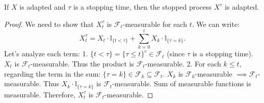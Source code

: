 \begin{proposition}
If $X$ is adapted and $\tau$ is a stopping time, then the stopped process $X^\tau$ is adapted.
\end{proposition}
\begin{proof}
We need to show that $X^\tau_t$ is $\mathcal{F}_t$-measurable for each $t$.
We can write:
\[
X^\tau_t = X_t \cdot \mathbb{I}_{\{t < \tau\}} + \sum_{k=0}^t X_k \cdot \mathbb{I}_{\{\tau = k\}}.
\]
Let's analyze each term:
1. $\{t < \tau\} = \{\tau \le t\}^c \in \mathcal{F}_t$ (since $\tau$ is a stopping time). $X_t$ is $\mathcal{F}_t$-measurable. Thus the product is $\mathcal{F}_t$-measurable.
2. For each $k \le t$, regarding the term in the sum:
   $\{\tau = k\} \in \mathcal{F}_k \subseteq \mathcal{F}_t$.
   $X_k$ is $\mathcal{F}_k$-measurable $\implies \mathcal{F}_t$-measurable.
   Thus $X_k \cdot \mathbb{I}_{\{\tau = k\}}$ is $\mathcal{F}_t$-measurable.
Sum of measurable functions is measurable.
Therefore, $X^\tau_t$ is $\mathcal{F}_t$-measurable.
\end{proof}
